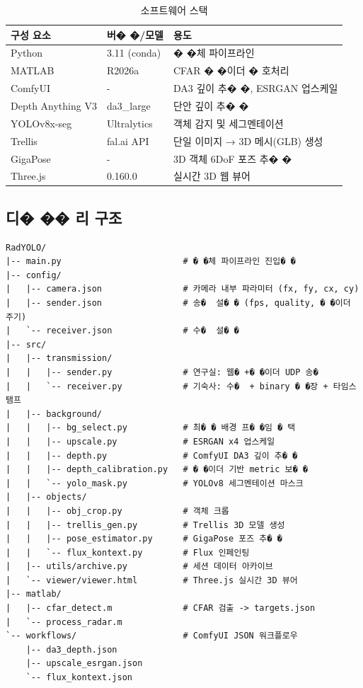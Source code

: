 \documentclass[a4paper,12pt]{article}
\begin{document}
\begin{table}[h]
\centering
\begin{tabularx}{\textwidth}{llX}
  \toprule
  \textbf{구성 요소} & \textbf{버� �/모델} & \textbf{용도} \\
  \midrule
  Python & 3.11 (conda) & � �체 파이프라인 \\
  MATLAB & R2026a & CFAR � �이더 � 호처리 \\
  ComfyUI & - & DA3 깊이 추� �, ESRGAN 업스케일 \\
  Depth Anything V3 & da3\_large & 단안 깊이 추� � \\
  YOLOv8x-seg & Ultralytics & 객체 감지 및 세그멘테이션 \\
  Trellis & fal.ai API & 단일 이미지 → 3D 메시(GLB) 생성 \\
  GigaPose & - & 3D 객체 6DoF 포즈 추� � \\
  Three.js & 0.160.0 & 실시간 3D 웹 뷰어 \\
  \bottomrule
\end{tabularx}
\caption{소프트웨어 스택}
\end{table}

\subsection{디� �� 리 구조}

\begin{lstlisting}[style=plain]
RadYOLO/
|-- main.py                        # � �체 파이프라인 진입� �
|-- config/
|   |-- camera.json                # 카메라 내부 파라미터 (fx, fy, cx, cy)
|   |-- sender.json                # 송�  설� � (fps, quality, � �이더 주기)
|   `-- receiver.json              # 수�  설� �
|-- src/
|   |-- transmission/
|   |   |-- sender.py              # 연구실: 웹� +� �이더 UDP 송� 
|   |   `-- receiver.py            # 기숙사: 수�  + binary � �장 + 타임스탬프
|   |-- background/
|   |   |-- bg_select.py           # 최� � 배경 프� �임 � 택
|   |   |-- upscale.py             # ESRGAN x4 업스케일
|   |   |-- depth.py               # ComfyUI DA3 깊이 추� �
|   |   |-- depth_calibration.py   # � �이더 기반 metric 보� �
|   |   `-- yolo_mask.py           # YOLOv8 세그멘테이션 마스크
|   |-- objects/
|   |   |-- obj_crop.py            # 객체 크롭
|   |   |-- trellis_gen.py         # Trellis 3D 모델 생성
|   |   |-- pose_estimator.py      # GigaPose 포즈 추� �
|   |   `-- flux_kontext.py        # Flux 인페인팅
|   |-- utils/archive.py           # 세션 데이터 아카이브
|   `-- viewer/viewer.html         # Three.js 실시간 3D 뷰어
|-- matlab/
|   |-- cfar_detect.m              # CFAR 검출 -> targets.json
|   `-- process_radar.m
`-- workflows/                     # ComfyUI JSON 워크플로우
    |-- da3_depth.json
    |-- upscale_esrgan.json
    `-- flux_kontext.json
\end{lstlisting}
\end{document}
